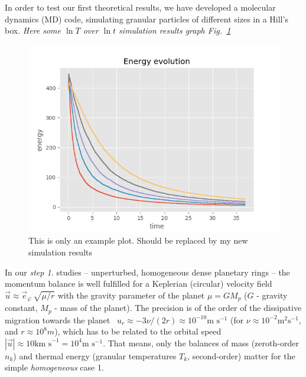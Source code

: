 \documentclass[11pt, notitlepage]{article} %
\begin{document}
In order to test our first theoretical results, we have developed a molecular dynamics (MD) 
code, simulating granular particles of different sizes in a Hill's box. 
\emph{Here some $\ln T$ over $\ln t$ simulation results graph Fig.~\ref{fig2}}
\begin{figure}[h] %
	\centering
	\includegraphics[scale = .80]{Figures/energy_evo.png}
	\caption{\footnotesize This is only an example plot. Should be replaced by my new simulation results}
	\label{fig2}
\end{figure}

In our {\em step 1.} studies  -- unperturbed, homogeneous dense planetary rings -- the momentum balance is well fulfilled for a 
Keplerian (circular) velocity field $\vec u \approx  \vec e_\varphi \ \sqrt{\mu/r}$ with the gravity parameter
of the planet $\mu = G M_p$  ($G$ - gravity constant, $M_p$ - mass of the planet).  The precision is of the order of the 
dissipative migration towards the planet \citep{spahn2000b} \, $u_r \approx - 3 \nu/(2 r) \approx 10^{-10} \text{m s}^{-1}$ (for 
$\nu \approx 10^{-2} \text{m}^2 \text{s}^{-1}$, 
and $r \approx 10^8 m$), which has to be related to the orbital speed $|\vec u| \approx 10 \text{km s}^{-1} = 10^4 \text{m s}^{-1}$. That means,
only the balances of mass (zeroth-order $n_k$) and thermal energy (granular temperatures $T_k$, second-order) matter for the
simple \emph{homogeneous} case 1.\\
\end{document}

